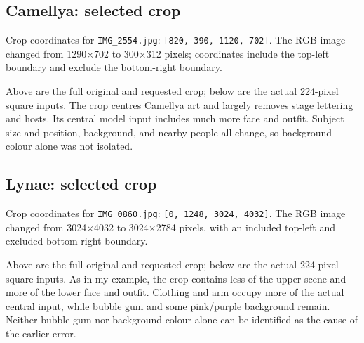 \documentclass[11pt]{article}
\begin{document}
\clearpage
\subsection*{Camellya: selected crop}
Crop coordinates for \texttt{IMG\_2554.jpg}: \texttt{[820, 390, 1120, 702]}. The RGB image changed from 1290$\times$702 to 300$\times$312 pixels; coordinates include the top-left boundary and exclude the bottom-right boundary.
\par\noindent\begin{minipage}{\linewidth}
Above are the full original and requested crop; below are the actual 224-pixel square inputs.
The crop centres Camellya art and largely removes stage lettering and hosts. Its central model input includes much more face and outfit. Subject size and position, background, and nearby people all change, so background colour alone was not isolated.
\end{minipage}\par\medskip

\clearpage
\subsection*{Lynae: selected crop}
Crop coordinates for \texttt{IMG\_0860.jpg}: \texttt{[0, 1248, 3024, 4032]}. The RGB image changed from 3024$\times$4032 to 3024$\times$2784 pixels, with an included top-left and excluded bottom-right boundary.
\par\noindent\begin{minipage}{\linewidth}
Above are the full original and requested crop; below are the actual 224-pixel square inputs.
As in my example, the crop contains less of the upper scene and more of the lower face and outfit. Clothing and arm occupy more of the actual central input, while bubble gum and some pink/purple background remain. Neither bubble gum nor background colour alone can be identified as the cause of the earlier error.
\end{minipage}\par\medskip
\end{document}
